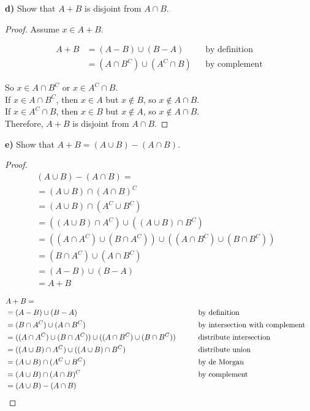 \documentclass[titlepage, letterpaper, fleqn]{article}
\newcommand{\spacepls}{\vspace{5mm}}
\begin{document}
\spacepls
{\large \textbf{d)} Show that \(A + B\) is disjoint from \(A \cap B\).}

\begin{proof}
	Assume \(x \in A + B\).

  \begin{align*}
  A + B &= (A-B) \cup (B-A)     &&\text{by definition}
  \\ &= (A \cap B^C) \cup (A^C \cap B)  &&\text{by complement}
  \end{align*}

  So \(x \in A \cap B^C\) or \(x \in A^C \cap B\). \\
  If \(x \in A \cap B^C\), then \(x \in A\) but \(x \not \in B\), so \(x \not \in A \cap B\). \\
  If \(x \in A^C \cap B\), then \(x \in B\) but \(x \not \in A\), so \(x \not \in A \cap B\). \\
  Therefore, \(A + B\) is disjoint from \(A \cap B\).
\end{proof}

\pagebreak
{\large \textbf{e)} Show that \(A + B = (A \cup B) - (A \cap B)\).}

\begin{proof}
	\begin{align*}
	& (A \cup B) - (A \cap B) =
	\\ &= (A \cup B) \cap (A \cap B)^C     &&\tag*{by complement}
	\\ &= (A \cup B) \cap (A^C \cup B^C) 	&&\tag*{by de Morgan}
	\\ &= ((A \cup B) \cap A^C) \cup ((A \cup B) \cap B^C) &&\tag*{distribute union}
	\\ &= ((A \cap A^C) \cup (B \cap A^C)) \cup ((A \cap B^C) \cup (B \cap B^C)) &&\tag*{distribute intersection}
	\\ &= (B \cap A^C) \cup (A \cap B^C) &&\tag*{by intersection with complement}
	\\ &= (A-B) \cup (B-A)	&&\tag*{by definition}
	\\ &= A + B
	\end{align*}

	\begin{align*}
	& A + B =
	\\ &= (A-B) \cup (B-A)	&&\tag*{by definition}
	\\ &= (B \cap A^C) \cup (A \cap B^C) &&\tag*{by intersection with complement}
	\\ &= ((A \cap A^C) \cup (B \cap A^C)) \cup ((A \cap B^C) \cup (B \cap B^C)) &&\tag*{distribute intersection}
	\\ &= ((A \cup B) \cap A^C) \cup ((A \cup B) \cap B^C) &&\tag*{distribute union}
	\\ &= (A \cup B) \cap (A^C \cup B^C) 	&&\tag*{by de Morgan}
	\\ &= (A \cup B) \cap (A \cap B)^C     &&\tag*{by complement}
	\\ &= (A \cup B) - (A \cap B) &&\qedhere
	\end{align*}
\end{proof}
\end{document}
